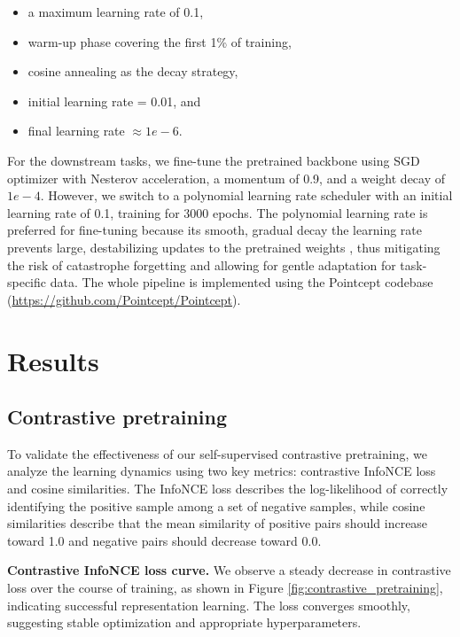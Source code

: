 \documentclass[review,authoryear]{elsarticle}
\begin{document}
\begin{itemize}
    \item a maximum learning rate of 0.1,
    \item warm-up phase covering the first 1\% of training,
    \item cosine annealing as the decay strategy,
    \item initial learning rate = 0.01, and
    \item final learning rate $\approx 1e-6$.
\end{itemize}

For the downstream tasks, we fine-tune the pretrained backbone using SGD optimizer with Nesterov acceleration, a momentum of 0.9, and a weight decay of $1e-4$. However, we switch to a polynomial learning rate scheduler with an initial learning rate of 0.1, training for 3000 epochs. The polynomial learning rate is preferred for fine-tuning because its smooth, gradual decay the learning rate prevents large, destabilizing updates to the pretrained weights \citep{mishra2019polynomial}, thus mitigating the risk of catastrophe forgetting and allowing for gentle adaptation for task-specific data. The whole pipeline is implemented using the Pointcept codebase (\url{https://github.com/Pointcept/Pointcept}).


\section{Results}
\label{sec:results}

\subsection{Contrastive pretraining}

To validate the effectiveness of our self-supervised contrastive pretraining, we analyze the learning dynamics using two key metrics: contrastive InfoNCE loss and cosine similarities. The InfoNCE loss describes the log-likelihood of correctly identifying the positive sample among a set of negative samples, while cosine similarities describe that the mean similarity of positive pairs should increase toward 1.0 and negative pairs should decrease toward 0.0. 

\textbf{Contrastive InfoNCE loss curve.} We observe a steady decrease in contrastive loss over the course of training, as shown in Figure \ref{fig:contrastive_pretraining}, indicating successful representation learning. The loss converges smoothly, suggesting stable optimization and appropriate hyperparameters. 
\end{document}
